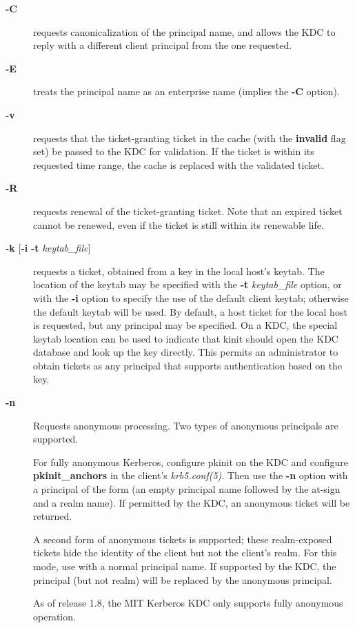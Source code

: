 \documentclass[letterpaper,10pt,english]{sphinxmanual}
\begin{document}
\begin{description}
\item[{\textbf{-C}}] \leavevmode
requests canonicalization of the principal name, and allows the
KDC to reply with a different client principal from the one
requested.

\item[{\textbf{-E}}] \leavevmode
treats the principal name as an enterprise name (implies the
\textbf{-C} option).

\item[{\textbf{-v}}] \leavevmode
requests that the ticket-granting ticket in the cache (with the
\textbf{invalid} flag set) be passed to the KDC for validation.  If the
ticket is within its requested time range, the cache is replaced
with the validated ticket.

\item[{\textbf{-R}}] \leavevmode
requests renewal of the ticket-granting ticket.  Note that an
expired ticket cannot be renewed, even if the ticket is still
within its renewable life.

\item[{\textbf{-k} {[}\textbf{-i} \textbar{} \textbf{-t} \emph{keytab\_file}{]}}] \leavevmode
requests a ticket, obtained from a key in the local host's keytab.
The location of the keytab may be specified with the \textbf{-t}
\emph{keytab\_file} option, or with the \textbf{-i} option to specify the use
of the default client keytab; otherwise the default keytab will be
used.  By default, a host ticket for the local host is requested,
but any principal may be specified.  On a KDC, the special keytab
location  can be used to indicate that kinit should open
the KDC database and look up the key directly.  This permits an
administrator to obtain tickets as any principal that supports
authentication based on the key.

\item[{\textbf{-n}}] \leavevmode
Requests anonymous processing.  Two types of anonymous principals
are supported.

For fully anonymous Kerberos, configure pkinit on the KDC and
configure \textbf{pkinit\_anchors} in the client's \emph{krb5.conf(5)}.
Then use the \textbf{-n} option with a principal of the form 
(an empty principal name followed by the at-sign and a realm
name).  If permitted by the KDC, an anonymous ticket will be
returned.

A second form of anonymous tickets is supported; these
realm-exposed tickets hide the identity of the client but not the
client's realm.  For this mode, use  with a normal
principal name.  If supported by the KDC, the principal (but not
realm) will be replaced by the anonymous principal.

As of release 1.8, the MIT Kerberos KDC only supports fully
anonymous operation.

\end{description}
\end{document}
